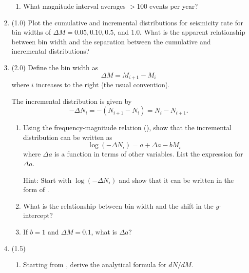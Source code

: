 \documentclass[11pt,titlepage,fleqn]{article}
\begin{document}
\begin{enumerate}
\begin{enumerate}
\item What magnitude interval averages $>$100 events per year?
\end{enumerate}


\item (1.0) Plot the cumulative and incremental distributions for seismicity rate for bin widths of $\Delta M = 0.05, 0.10, 0.5$, and 1.0. What is the apparent relationship between bin width and the separation between the cumulative and incremental distributions?


\item (2.0) Define the bin width as
%
\begin{equation}
\Delta M = M_{i+1} - M_i
\label{dM}
\end{equation}
%
where $i$ increases to the right (the usual convention).

The incremental distribution is given by
%
\begin{equation}
-\Delta N_i = -(N_{i+1} - N_i) = N_i - N_{i+1}.
\end{equation}
%
\begin{enumerate}
\item Using the frequency-magnitude relation (), show that the incremental distribution can be written as
%
\begin{equation}
\log(-\Delta N_i) = a + \Delta a - b M_i
\label{inc}
\end{equation}
%
where $\Delta a$ is a function in terms of other variables. List the expression for $\Delta a$.

Hint: Start with $\log(-\Delta N_i)$ and show that it can be written in the form of .

\item What is the relationship between bin width and the shift in the $y$-intercept?

\item If $b = 1$ and $\Delta M = 0.1$, what is $\Delta a$?
\end{enumerate}


\item  (1.5)
%
\begin{enumerate}
\item Starting from , derive the analytical formula for $d N/ d M$.


\end{enumerate}
\end{enumerate}
\end{document}
